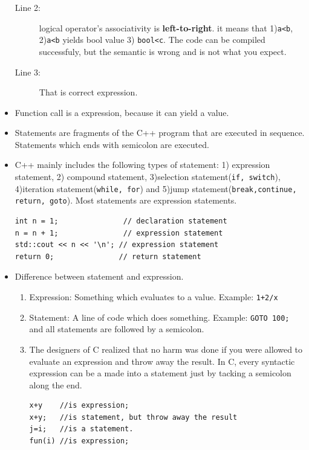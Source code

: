 \documentclass[a4paper,11pt,twoside]{book}
\begin{document}
\begin{itemize}
\begin{description}
	\item[Line 2:] logical operator's associativity is \textbf{left-to-right}. it means that 1)\texttt{a<b}, 2)\texttt{a<b} yields bool value 3) \texttt{bool<c}. The code can be compiled successfuly, but the semantic is wrong and is not what you expect.  
	
	\item[Line 3:] That is correct expression.
\end{description}

	\item Function call is a expression, because it can yield a value.


	\item Statements are fragments of the C++ program that are executed in sequence. Statements which ends with semicolon are executed.
	
	\item C++ mainly includes the following types of statement: 1) expression statement, 2) compound statement, 3)selection statement(\texttt{if, switch}), 4)iteration statement(\texttt{while, for}) and 5)jump statement(\texttt{break,continue, return, goto}). Most statements are expression statements.
	
\begin{lstlisting}[numbers=none]
int n = 1;               // declaration statement
n = n + 1;               // expression statement
std::cout << n << '\n'; // expression statement
return 0;               // return statement
\end{lstlisting}
	
\item Difference between statement and expression.
	\begin{enumerate}
		\item Expression: Something which evaluates to a value. Example: \texttt{1+2/x}
		
		\item Statement: A line of code which does something. Example: \texttt{GOTO 100;} and all statements are followed by a semicolon.
	
		\item The designers of C realized that no harm was done if you were allowed to evaluate an expression and throw away the result. In C, every syntactic expression can be a made into a statement just by tacking a semicolon along the end.
	
\begin{lstlisting}[numbers=none]
x+y    //is expression;
x+y;   //is statement, but throw away the result
j=i;   //is a statement.
fun(i) //is expression;
\end{lstlisting} 
\end{enumerate}

\end{itemize}
\end{document}
